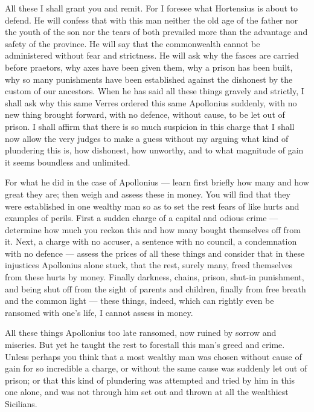  All these I shall grant you and remit. For I foresee what Hortensius is about to defend. He will confess that with this man neither the old age of the father nor the youth of the son nor the tears of both prevailed more than the advantage and safety of the province. He will say that the commonwealth cannot be administered without fear and strictness. He will ask why the fasces are carried before praetors, why axes have been given them, why a prison has been built, why so many punishments have been established against the dishonest by the custom of our ancestors. When he has said all these things gravely and strictly, I shall ask why this same Verres ordered this same Apollonius suddenly, with no new thing brought forward, with no defence, without cause, to be let out of prison. I shall affirm that there is so much suspicion in this charge that I shall now allow the very judges to make a guess without my arguing what kind of plundering this is, how dishonest, how unworthy, and to what magnitude of gain it seems boundless and unlimited.

 For what he did in the case of Apollonius --- learn first briefly how many and how great they are; then weigh and assess these in money. You will find that they were established in one wealthy man so as to set the rest fears of like hurts and examples of perils. First a sudden charge of a capital and odious crime --- determine how much you reckon this and how many bought themselves off from it. Next, a charge with no accuser, a sentence with no council, a condemnation with no defence --- assess the prices of all these things and consider that in these injustices Apollonius alone stuck, that the rest, surely many, freed themselves from these hurts by money. Finally darkness, chains, prison, shut-in punishment, and being shut off from the sight of parents and children, finally from free breath and the common light --- these things, indeed, which can rightly even be ransomed with one's life, I cannot assess in money.

 All these things Apollonius too late ransomed, now ruined by sorrow and miseries. But yet he taught the rest to forestall this man's greed and crime. Unless perhaps you think that a most wealthy man was chosen without cause of gain for so incredible a charge, or without the same cause was suddenly let out of prison; or that this kind of plundering was attempted and tried by him in this one alone, and was not through him set out and thrown at all the wealthiest Sicilians.

